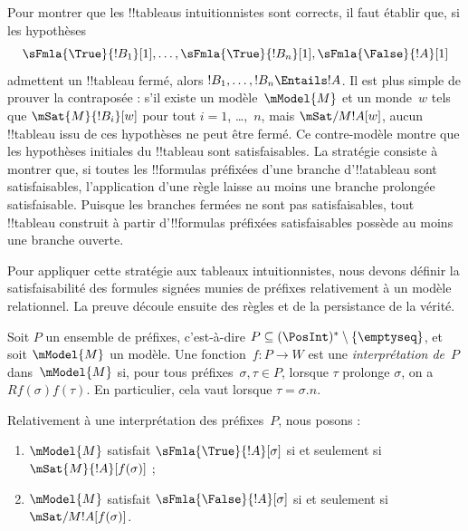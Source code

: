 \documentclass[../../../include/open-logic-section]{subfiles}
\begin{document}


\begin{explain}
  Pour montrer que les !!{tableau}s intuitionnistes sont corrects, il
  faut établir que, si les hypothèses
  \[
  \sFmla{\True}{!B_1}[1], \dots, \sFmla{\True}{!B_n}[1], \sFmla{\False}{!A}[1]
  \]
  admettent un !!{tableau} fermé, alors $!B_1, \dots, !B_n \Entails
  !A$. Il est plus simple de prouver la contraposée : s'il existe un
  modèle~$\mModel{M}$ et un monde~$w$ tels que
  $\mSat{M}{!B_i}[w]$ pour tout $i=1$, \dots,~$n$, mais
  $\mSat/{M}{!A}[w]$, aucun !!{tableau} issu de ces hypothèses ne
  peut être fermé. Ce contre-modèle montre que les hypothèses
  initiales du !!{tableau} sont satisfaisables. La stratégie
  consiste à montrer que, si toutes les !!{formula}s préfixées d'une
  branche d'!!a{tableau} sont satisfaisables, l'application d'une
  règle laisse au moins une branche prolongée satisfaisable. Puisque
  les branches fermées ne sont pas satisfaisables, tout !!{tableau}
  construit à partir d'!!{formula}s préfixées satisfaisables possède
  au moins une branche ouverte.

  Pour appliquer cette stratégie aux tableaux intuitionnistes, nous
  devons définir la satisfaisabilité des formules signées munies de
  préfixes relativement à un modèle relationnel. La preuve découle
  ensuite des règles et de la persistance de la vérité.
\end{explain}

\begin{defn}
  Soit $P$ un ensemble de préfixes, c'est-à-dire $P \subseteq
  (\PosInt)^* \setminus \{\emptyseq\}$, et soit $\mModel{M}$ un
  modèle. Une fonction~$f\colon P \to W$ est une
  \emph{interprétation de}~$P$ dans~$\mModel{M}$ si, pour tous
  préfixes~$\sigma,\tau\in P$, lorsque $\tau$ prolonge $\sigma$,
  on a $Rf(\sigma)f(\tau)$. En particulier, cela vaut lorsque
  $\tau=\sigma.n$.

  Relativement à une interprétation des préfixes~$P$, nous posons :
  \begin{enumerate}
  \item $\mModel{M}$ satisfait $\sFmla{\True}{!A}[\sigma]$ si et
    seulement si $\mSat{M}{!A}[f(\sigma)]$ ;
  \item $\mModel{M}$ satisfait $\sFmla{\False}{!A}[\sigma]$ si et
    seulement si $\mSat/{M}{!A}[f(\sigma)]$.
  \end{enumerate}
\end{defn}
\end{document}
